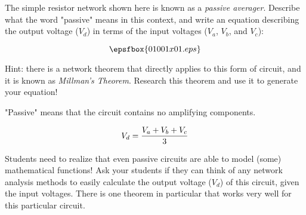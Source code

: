 

The simple resistor network shown here is known as a {\it passive averager}.  Describe what the word "passive" means in this context, and write an equation describing the output voltage ($V_d$) in terms of the input voltages ($V_a$, $V_b$, and $V_c$):

$$\epsfbox{01001x01.eps}$$

Hint: there is a network theorem that directly applies to this form of circuit, and it is known as {\it Millman's Theorem}.  Research this theorem and use it to generate your equation!







"Passive" means that the circuit contains no amplifying components.

$$V_d = {{V_a + V_b + V_c} \over 3}$$







Students need to realize that even passive circuits are able to model (some) mathematical functions!  Ask your students if they can think of any network analysis methods to easily calculate the output voltage ($V_d$) of this circuit, given the input voltages.  There is one theorem in particular that works very well for this particular circuit.




